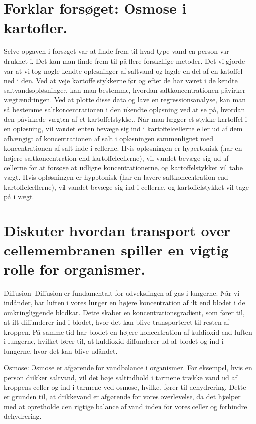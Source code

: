     \section*{Forklar forsøget: Osmose i kartofler.}
        Selve opgaven i forsøget var at finde frem til hvad type vand en person var druknet i. Det kan man finde frem til på flere forskellige metoder. Det vi gjorde var at vi tog nogle kendte opløsninger af saltvand og lagde en del af en katoffel ned i den. Ved at veje kartoffelstykkerne før og efter de har været i de kendte saltvandsopløsninger, kan man bestemme, hvordan saltkoncentrationen påvirker vægtændringen. Ved at plotte disse data og lave en regressionsanalyse, kan man så bestemme saltkoncentrationen i den ukendte opløsning ved at se på, hvordan den påvirkede vægten af et kartoffelstykke.. Når man lægger et stykke kartoffel i en opløsning, vil vandet enten bevæge sig ind i kartoffelcellerne eller ud af dem afhængigt af koncentrationen af salt i opløsningen sammenlignet med koncentrationen af salt inde i cellerne. Hvis opløsningen er hypertonisk (har en højere saltkoncentration end kartoffelcellerne), vil vandet bevæge sig ud af cellerne for at forsøge at udligne koncentrationerne, og kartoffelstykket vil tabe vægt. Hvis opløsningen er hypotonisk (har en lavere saltkoncentration end kartoffelcellerne), vil vandet bevæge sig ind i cellerne, og kartoffelstykket vil tage på i vægt.
    
        \section*{Diskuter hvordan transport over cellemembranen spiller en vigtig rolle for organismer.} %
            Diffusion: Diffusion er fundamentalt for udvekslingen af  gas i lungerne. Når vi indånder, har luften i vores lunger en højere koncentration af ilt end blodet i de omkringliggende blodkar. Dette skaber en koncentrationsgradient, som fører til, at ilt diffunderer ind i blodet, hvor det kan blive transporteret til resten af kroppen. På samme tid har blodet en højere koncentration af kuldioxid end luften i lungerne, hvilket fører til, at kuldioxid diffunderer ud af blodet og ind i lungerne, hvor det kan blive udåndet.

            Osmose: Osmose er afgørende for vandbalance i organismer. For eksempel, hvis en person drikker saltvand, vil det høje saltindhold i tarmene trække vand ud af kroppens celler og ind i tarmene ved osmose, hvilket fører til dehydrering. Dette er grunden til, at drikkevand er afgørende for vores overlevelse, da det hjælper med at opretholde den rigtige balance af vand inden for vores celler og forhindre dehydrering.

